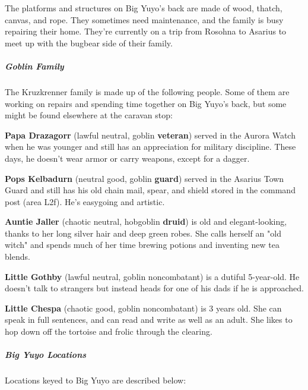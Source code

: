 \documentclass[10pt,a4paper,twoside,bg=print,twocolumn,openany,nodeprecatedcode]{dndbook}
\begin{document}
The platforms and structures on Big Yuyo's back are made of wood, thatch, canvas, and rope. They sometimes need maintenance, and the family is busy repairing their home. They're currently on a trip from Rosohna to Asarius to meet up with the bugbear side of their family.

\subparagraph{Goblin Family}
The Kruzkrenner family is made up of the following people. Some of them are working on repairs and spending time together on Big Yuyo's back, but some might be found elsewhere at the caravan stop:

\textbf{Papa Drazagorr} (lawful neutral, goblin \textbf{veteran}) served in the Aurora Watch when he was younger and still has an appreciation for military discipline. These days, he doesn't wear armor or carry weapons, except for a dagger.

\textbf{Pops Kelbadurn} (neutral good, goblin \textbf{guard}) served in the Asarius Town Guard and still has his old chain mail, spear, and shield stored in the command post (area L2f). He's easygoing and artistic.

\textbf{Auntie Jaller} (chaotic neutral, hobgoblin \textbf{druid}) is old and elegant-looking, thanks to her long silver hair and deep green robes. She calls herself an "old witch" and spends much of her time brewing potions and inventing new tea blends.

\textbf{Little Gothby} (lawful neutral, goblin noncombatant) is a dutiful 5-year-old. He doesn't talk to strangers but instead heads for one of his dads if he is approached.

\textbf{Little Chespa} (chaotic good, goblin noncombatant) is 3 years old. She can speak in full sentences, and can read and write as well as an adult. She likes to hop down off the tortoise and frolic through the clearing.

\subparagraph{Big Yuyo Locations}
Locations keyed to Big Yuyo are described below:
\end{document}
